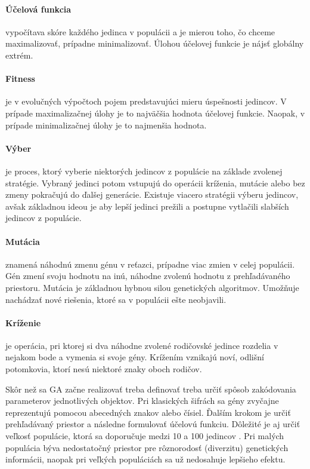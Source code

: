 \paragraph{Účelová funkcia} vypočítava skóre každého jedinca v populácii a je mierou toho, čo chceme maximalizovať, prípadne minimalizovať.
Úlohou účelovej funkcie je nájsť globálny extrém.

\paragraph{Fitness} je v evolučných výpočtoch pojem predstavujúci mieru úspešnosti jedincov.
V prípade maximalizačnej úlohy je to najväčšia hodnota účelovej funkcie. Naopak, v prípade minimalizačnej úlohy je to najmenšia hodnota.

\paragraph{Výber} je proces, ktorý vyberie niektorých jedincov z populácie na základe zvolenej stratégie.
Vybraný jedinci potom vstupujú do operácii kríženia, mutácie alebo bez zmeny pokračujú do ďalšej generácie.
Existuje viacero stratégii výberu jedincov, avšak základnou ideou je aby lepší jedinci prežili a postupne vytlačili slabších jedincov z populácie.

\paragraph{Mutácia} znamená náhodnú zmenu génu v reťazci, prípadne viac zmien v celej populácii.
Gén zmení svoju hodnotu na inú, náhodne zvolenú hodnotu z prehľadávaného priestoru.
Mutácia je základnou hybnou silou genetických algoritmov. Umožňuje nachádzať nové riešenia, ktoré sa v populácii ešte neobjavili.

\paragraph{Kríženie} je operácia, pri ktorej si dva náhodne zvolené rodičovské jedince rozdelia v nejakom bode a vymenia si svoje gény.
Krížením vznikajú noví, odlišní potomkovia, ktorí nesú niektoré znaky oboch rodičov.

Skôr než sa GA začne realizovať treba definovať treba určiť spôsob zakódovania parameterov jednotlivých objektov.
Pri klasických šifrách sa gény zvyčajne reprezentujú pomocou abecedných znakov alebo čísiel.
Ďalším krokom je určiť prehľadávaný priestor a následne formulovať účelovú funkciu. Dôležité je aj určiť veľkosť populácie,
ktorá sa doporučuje medzi 10 a 100 jedincov \cite{ev}.
Pri malých populácia býva nedostatočný priestor pre rôznorodosť (diverzitu) genetických informácii,
naopak pri veľkých populáciách sa už nedosahuje lepšieho efektu.

